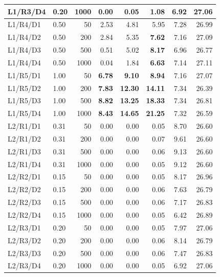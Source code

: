 \documentclass[11pt,a4paper]{article}
\begin{document}
\begin{small}
\begin{longtable}{llrrrrrr}
L1/R3/D4 & 0.20 & 1000 & \textcolor{alertred}{0.00} & \textcolor{alertred}{0.05} & \textcolor{alertred}{1.08} & 6.92 & 27.06 \\
\midrule
L1/R4/D1 & 0.50 & 50 & 2.53 & 4.81 & 5.95 & 7.28 & 26.99 \\
L1/R4/D2 & 0.50 & 200 & 2.84 & 5.35 & \textbf{7.62} & 7.16 & 27.09 \\
L1/R4/D3 & 0.50 & 500 & \textcolor{alertred}{0.51} & 5.02 & \textbf{8.17} & 6.96 & 26.77 \\
L1/R4/D4 & 0.50 & 1000 & \textcolor{alertred}{0.04} & \textcolor{alertred}{1.84} & \textbf{6.63} & 7.14 & 27.11 \\
\midrule
L1/R5/D1 & 1.00 & 50 & \textbf{6.78} & \textbf{9.10} & \textbf{8.94} & 7.16 & 27.07 \\
L1/R5/D2 & 1.00 & 200 & \textbf{7.83} & \textbf{12.30} & \textbf{14.11} & 7.34 & 26.39 \\
L1/R5/D3 & 1.00 & 500 & \textbf{8.82} & \textbf{13.25} & \textbf{18.33} & 7.34 & 26.81 \\
L1/R5/D4 & 1.00 & 1000 & \textbf{8.43} & \textbf{14.65} & \textbf{21.25} & 7.32 & 26.59 \\
\midrule
L2/R1/D1 & 0.31 & 50 & 0.00 & 0.00 & 0.05 & 8.70 & 26.60 \\
L2/R1/D2 & 0.31 & 200 & 0.00 & 0.00 & 0.07 & 9.61 & 26.60 \\
L2/R1/D3 & 0.31 & 500 & 0.00 & 0.00 & 0.06 & 9.13 & 26.60 \\
L2/R1/D4 & 0.31 & 1000 & 0.00 & 0.00 & 0.05 & \textcolor{alertred}{9.12} & 26.60 \\
\midrule
L2/R2/D1 & 0.15 & 50 & 0.00 & 0.00 & 0.05 & 8.17 & 26.96 \\
L2/R2/D2 & 0.15 & 200 & 0.00 & 0.00 & 0.06 & 7.63 & 26.79 \\
L2/R2/D3 & 0.15 & 500 & 0.00 & 0.00 & 0.06 & \textcolor{alertred}{7.17} & 26.83 \\
L2/R2/D4 & 0.15 & 1000 & 0.00 & 0.00 & 0.05 & \textcolor{alertred}{6.42} & 26.89 \\
\midrule
L2/R3/D1 & 0.20 & 50 & 0.00 & 0.00 & 0.05 & 7.97 & 27.06 \\
L2/R3/D2 & 0.20 & 200 & 0.00 & 0.00 & 0.06 & 8.14 & 26.79 \\
L2/R3/D3 & 0.20 & 500 & 0.00 & 0.00 & 0.06 & \textcolor{alertred}{7.47} & 26.83 \\
L2/R3/D4 & 0.20 & 1000 & 0.00 & 0.00 & 0.05 & \textcolor{alertred}{6.92} & 27.06 \\
\midrule

\end{longtable}
\end{small}
\end{document}
